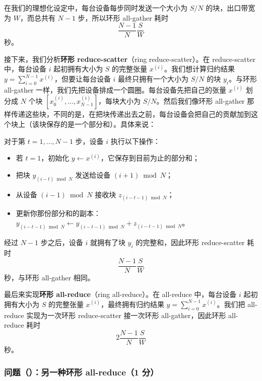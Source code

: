 在我们的理想化设定中，每台设备每步同时发送一个大小为 $S/N$ 的块，出口带宽为 $W$，而总共有 $N-1$ 步，所以环形 all-gather 耗时
\begin{equation}
\frac{N-1}{N}\frac{S}{W}
\end{equation}
秒。

接下来，我们分析\textbf{环形 reduce-scatter}（ring reduce-scatter）。在 reduce-scatter 中，每台设备 $i$ 起初拥有大小为 $S$ 的完整张量 $x^{(i)}$。我们想计算归约结果 $y=\sum_{i=0}^{N-1} x^{(i)}$，但要让每台设备 $i$ 最终只拥有一个大小为 $S/N$ 的块 $y_i$。与环形 all-gather 一样，我们先把设备排成一个圆圈。每台设备先把自己的张量 $x^{(i)}$ 划分成 $N$ 个块 $[x^{(i)}_0,\ldots,x^{(i)}_{N-1}]$，每块大小为 $S/N$。然后我们像环形 all-gather 那样传递这些块，不同的是，在把块传递出去之前，每台设备会把自己的贡献加到这个块上（该块保存的是一个部分和）。具体来说：

对于第 $t=1,\ldots,N-1$ 步，设备 $i$ 执行以下操作：

\begin{itemize}
  \item 若 $t=1$，初始化 $y \leftarrow x^{(i)}$，它保存到目前为止的部分和；
  \item 把块 $y_{(i-t)\bmod N}$ 发送给设备 $(i+1)\bmod N$；
  \item 从设备 $(i-1)\bmod N$ 接收块 $z_{(i-t-1)\bmod N}$；
  \item 更新你那份部分和的副本：$y_{(i-t-1)\bmod N} \leftarrow y_{(i-t-1)\bmod N} + z_{(i-t-1)\bmod N}$。
\end{itemize}

经过 $N-1$ 步之后，设备 $i$ 就拥有了块 $y_i$ 的完整和，因此环形 reduce-scatter 耗时
\begin{equation}
\frac{N-1}{N}\frac{S}{W}
\end{equation}
秒，与环形 all-gather 相同。

最后来实现\textbf{环形 all-reduce}（ring all-reduce）。在 all-reduce 中，每台设备 $i$ 起初拥有大小为 $S$ 的完整张量 $x^{(i)}$，最终拥有归约结果 $y=\sum_{i=0}^{N-1} x^{(i)}$。我们把 all-reduce 实现为一次环形 reduce-scatter 接一次环形 all-gather，因此环形 all-reduce 耗时
\begin{equation}
2\frac{N-1}{N}\frac{S}{W}
\end{equation}
秒。

\subsubsection*{问题（）：另一种环形 all-reduce（1 分）}

